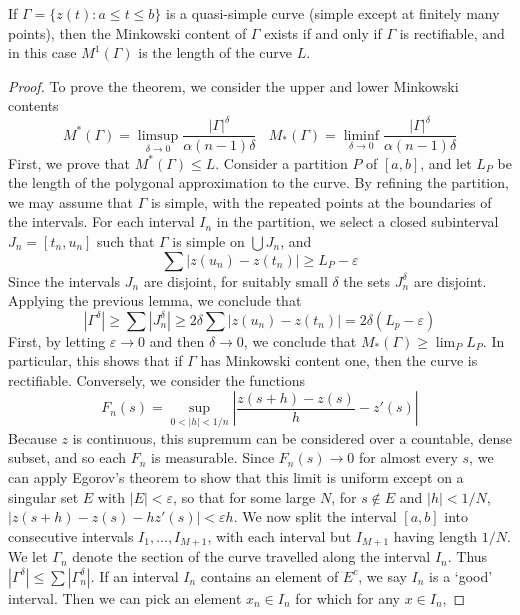 \begin{theorem}
  If $\Gamma = \{ z(t): a \leq t \leq b \}$ is a quasi-simple curve (simple except at finitely many points), then the Minkowski content of $\Gamma$ exists if and only if $\Gamma$ is rectifiable, and in this case $M^1(\Gamma)$ is the length of the curve $L$.
\end{theorem}
\begin{proof}
  To prove the theorem, we consider the upper and lower Minkowski contents
  \[ M^*(\Gamma) = \limsup_{\delta\to 0} \frac{|\Gamma|^\delta}{\alpha(n-1) \delta}\ \ \ \ M_*(\Gamma) = \liminf_{\delta \to 0} \frac{|\Gamma|^\delta}{\alpha(n-1) \delta} \]
  First, we prove that $M^*(\Gamma) \leq L$. Consider a partition $P$ of $[a,b]$, and let $L_P$ be the length of the polygonal approximation to the curve. By refining the partition, we may assume that $\Gamma$ is simple, with the repeated points at the boundaries of the intervals. For each interval $I_n$ in the partition, we select a closed subinterval $J_n = [t_n,u_n]$ such that $\Gamma$ is simple on $\bigcup J_n$, and
  \[ \sum |z(u_n) - z(t_n)| \geq L_P - \varepsilon \]
  Since the intervals $J_n$ are disjoint, for suitably small $\delta$ the sets $J_n^\delta$ are disjoint. Applying the previous lemma, we conclude that
  \[ |\Gamma^\delta| \geq \sum |J_n^\delta| \geq 2 \delta \sum |z(u_n) - z(t_n)| = 2 \delta (L_p - \varepsilon) \]
  First, by letting $\varepsilon \to 0$ and then $\delta \to 0$, we conclude that $M_*(\Gamma) \geq \lim_P L_P$. In particular, this shows that if $\Gamma$ has Minkowski content one, then the curve is rectifiable. Conversely, we consider the functions
  \[ F_n(s) = \sup_{0 < |h| < 1/n} \left| \frac{z(s+h) - z(s)}{h} - z'(s) \right| \]
  Because $z$ is continuous, this supremum can be considered over a countable, dense subset, and so each $F_n$ is measurable. Since $F_n(s) \to 0$ for almost every $s$, we can apply Egorov's theorem to show that this limit is uniform except on a singular set $E$ with $|E| < \varepsilon$, so that for some large $N$, for $s \not \in E$ and $|h| < 1/N$, $|z(s+h) - z(s) - hz'(s)| < \varepsilon h$. We now split the interval $[a,b]$ into consecutive intervals $I_1, \dots, I_{M+1}$, with each interval but $I_{M+1}$ having length $1/N$. We let $\Gamma_n$ denote the section of the curve travelled along the interval $I_n$. Thus $|\Gamma^\delta| \leq \sum |\Gamma_n^\delta|$. If an interval $I_n$ contains an element of $E^c$, we say $I_n$ is a `good' interval. Then we can pick an element $x_n \in I_n$ for which for any $x \in I_n$,

\end{proof}
